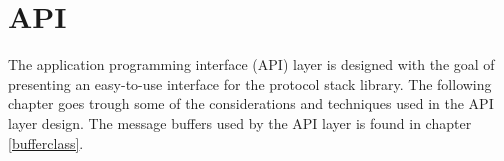 \chapter{API}\label{chap:api}
The application programming interface (API) layer is designed with the goal of presenting an easy-to-use interface for the protocol stack library. The following chapter goes trough some of the considerations and techniques used in the API layer design. The message buffers used by the API layer is found in chapter \ref{bufferclass}.



















